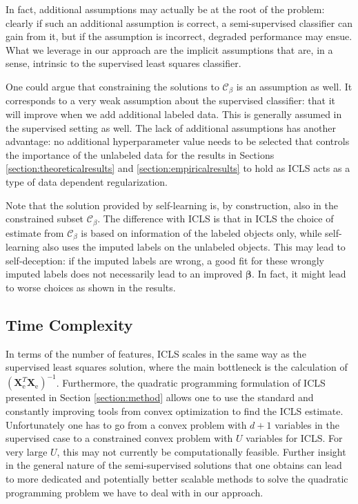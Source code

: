 \documentclass[twoside]{memoir}\usepackage[]{graphicx}\usepackage{xcolor}
\newcommand{\Xe}{\mathbf{X}_\mathrm{e}  }
\newcommand{\XeT}{\mathbf{X}_\mathrm{e}^T}
\newcommand{\Cb}{\mathcal{C}_{\beta}}
\newcommand{\featdim}{d}
\newcommand{\Nunl}{U}
\begin{document}
In fact, additional assumptions may actually be at the root of the problem: clearly if such an additional assumption is correct, a semi-supervised classifier can gain from it, but if the assumption is incorrect, degraded performance may ensue.  What we leverage in our approach are the implicit assumptions that are, in a sense, intrinsic to the supervised least squares classifier. 

One could argue that constraining the solutions to $\Cb$ is an assumption as well. It corresponds to a very weak assumption about the supervised classifier: that it will improve when we add additional labeled data. This is generally assumed in the supervised setting as well. The lack of additional assumptions has another advantage: no additional hyperparameter value needs to be selected that controls the importance of the unlabeled data for the results in Sections \ref{section:theoreticalresults} and \ref{section:empiricalresults} to hold as ICLS acts as a type of data dependent regularization.

Note that the solution provided by self-learning is, by construction, also in the constrained subset $\Cb$. The difference with ICLS is that in ICLS the choice of estimate from $\Cb$ is based on information of the labeled objects only, while self-learning also uses the imputed labels on the unlabeled objects. This may lead to self-deception: if the imputed labels are wrong, a good fit for these wrongly imputed labels does not necessarily lead to an improved $\boldsymbol{\beta}$. In fact, it might lead to worse choices as shown in the results.

\subsection*{Time Complexity}
In terms of the number of features, ICLS scales in the same way as the supervised least squares solution, where the main bottleneck is the calculation of $(\XeT \Xe)^{-1}$. Furthermore, the quadratic programming formulation of ICLS presented in Section \ref{section:method} allows one to use the standard and constantly improving tools from convex optimization to find the ICLS estimate. Unfortunately one has to go from a convex problem with $\featdim+1$ variables in the supervised case to a constrained convex problem with $\Nunl$ variables for ICLS. For very large $\Nunl$, this may not currently be computationally feasible. Further insight in the general nature of the semi-supervised solutions that one obtains can lead to more dedicated and potentially better scalable methods to solve the quadratic programming problem we have to deal with in our approach.
\end{document}
